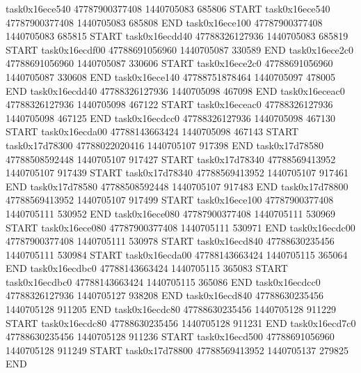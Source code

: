 task0x16ece540 47787900377408          1440705083               685806  START
task0x16ece540 47787900377408          1440705083               685808  END
task0x16ece100 47787900377408          1440705083               685815  START
task0x16ecdd40 47788326127936          1440705083               685819  START
task0x16ecdf00 47788691056960          1440705087               330589  END
task0x16ece2c0 47788691056960          1440705087               330606  START
task0x16ece2c0 47788691056960          1440705087               330608  END
task0x16ece140 47788751878464          1440705097               478005  END
task0x16ecdd40 47788326127936          1440705098               467098  END
task0x16eceac0 47788326127936          1440705098               467122  START
task0x16eceac0 47788326127936          1440705098               467125  END
task0x16ecdcc0 47788326127936          1440705098               467130  START
task0x16ecda00 47788143663424          1440705098               467143  START
task0x17d78300 47788022020416          1440705107               917398  END
task0x17d78580 47788508592448          1440705107               917427  START
task0x17d78340 47788569413952          1440705107               917439  START
task0x17d78340 47788569413952          1440705107               917461  END
task0x17d78580 47788508592448          1440705107               917483  END
task0x17d78800 47788569413952          1440705107               917499  START
task0x16ece100 47787900377408          1440705111               530952  END
task0x16ece080 47787900377408          1440705111               530969  START
task0x16ece080 47787900377408          1440705111               530971  END
task0x16ecdc00 47787900377408          1440705111               530978  START
task0x16ecd840 47788630235456          1440705111               530984  START
task0x16ecda00 47788143663424          1440705115               365064  END
task0x16ecdbc0 47788143663424          1440705115               365083  START
task0x16ecdbc0 47788143663424          1440705115               365086  END
task0x16ecdcc0 47788326127936          1440705127               938208  END
task0x16ecd840 47788630235456          1440705128               911205  END
task0x16ecdc80 47788630235456          1440705128               911229  START
task0x16ecdc80 47788630235456          1440705128               911231  END
task0x16ecd7c0 47788630235456          1440705128               911236  START
task0x16ecd500 47788691056960          1440705128               911249  START
task0x17d78800 47788569413952          1440705137               279825  END

